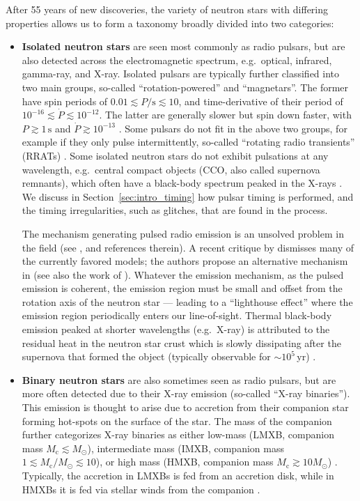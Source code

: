 After 55 years of new discoveries, the variety of neutron stars with differing properties allows us to form a taxonomy broadly divided into two categories:
\begin{itemize}
    \item \textbf{Isolated neutron stars} are seen most commonly as radio pulsars, but are also detected across the electromagnetic spectrum, e.g.~optical, infrared, gamma-ray, and X-ray. Isolated pulsars are typically further classified into two main groups, so-called ``rotation-powered'' and ``magnetars''. The former have spin periods of $0.01 \lesssim P / \textrm{s} \lesssim 10$, and time-derivative of their period of $10^{-16} \lesssim \dot{P} \lesssim 10^{-12}$. The latter are generally slower but spin down faster, with $P \gtrsim 1\,\textrm{s}$ and $\dot{P} \gtrsim 10^{-13}$ \citep{Lyne2012}. Some pulsars do not fit in the above two groups, for example if they only pulse intermittently, so-called ``rotating radio transients'' (RRATs) \citep{Keane2011}. Some isolated neutron stars do not exhibit pulsations at any wavelength, e.g.~central compact objects (CCO, also called supernova remnants), which often have a black-body spectrum peaked in the X-rays \citep{Pavlov2004,Chevalier2005}. We discuss in Section~\ref{sec:intro_timing} how pulsar timing is performed, and the timing irregularities, such as glitches, that are found in the process.
    
    The mechanism generating pulsed radio emission is an unsolved problem in the field (see \citet{Cerutti2017}, \citet{Harding2017} and references therein). A recent critique by \citet{Melrose2021a} dismisses many of the currently favored models; the authors propose an alternative mechanism in \citet{Melrose2021} (see also the work of \citet{Philippov2020}). Whatever the emission mechanism, as the pulsed emission is coherent, the emission region must be small and offset from the rotation axis of the neutron star --- leading to a ``lighthouse effect'' where the emission region periodically enters our line-of-sight. Thermal black-body emission peaked at shorter wavelengths (e.g.~X-ray) is attributed to the residual heat in the neutron star crust which is slowly dissipating after the supernova that formed the object (typically observable for $\sim10^5\,$yr) \citep{Zavlin2009}. 
    
    \item \textbf{Binary neutron stars} are also sometimes seen as radio pulsars, but are more often detected due to their X-ray emission (so-called ``X-ray binaries''). This emission is thought to arise due to accretion from their companion star forming hot-spots on the surface of the star. The mass of the companion further categorizes X-ray binaries as either low-mass (LMXB, companion mass $M_\textrm{c} \lesssim M_\odot$), intermediate mass (IMXB, companion mass $1 \lesssim M_\textrm{c} / M_\odot \lesssim 10$), or high mass (HMXB, companion mass $M_\textrm{c} \gtrsim 10 M_\odot$) \citep{Psaltis2006}. Typically, the accretion in LMXBs is fed from an accretion disk, while in HMXBs it is fed via stellar winds from the companion \citep{Bondi1944,Karino2019}. 
    

\end{itemize}
